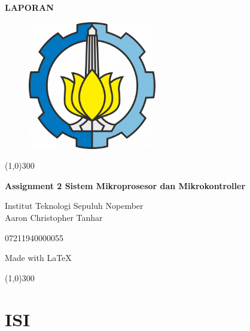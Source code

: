 \documentclass[a4paper,12pt]{article}
\title{}
\author{}
\date{}
\begin{document}
\begin{titlepage}
\begin{center}
\textbf{LAPORAN}
\vspace{1cm}
\end{center}
\begin{figure}[H]
\centering
\includegraphics[width=0.5\textwidth]{its}\\
\end{figure}
\vspace{3cm}
\begin{center}
\line(1,0){300}

\textbf{Assignment 2 Sistem Mikroprosesor dan Mikrokontroller}


Institut Teknologi Sepuluh Nopember
\\[1cm]
Aaron Christopher Tanhar

07211940000055

Made with \LaTeX\

\line(1,0){300}\\
\end{center}
\end{titlepage}
\tableofcontents
\thispagestyle{empty}
\cleardoublepage
\setcounter{page}{1}

\section{\textbf{ISI}}
\end{document}

